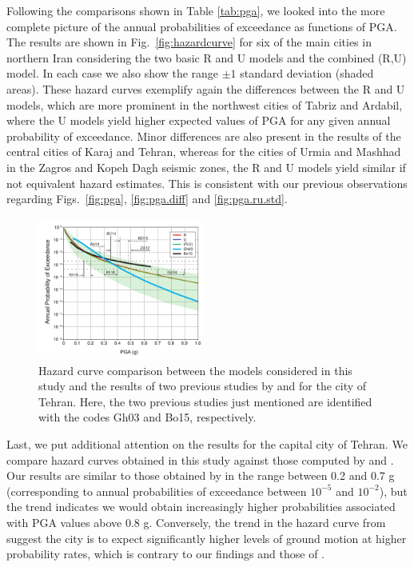 
Following the comparisons shown in Table \ref{tab:pga}, we looked into the more complete picture of the annual probabilities of exceedance as functions of PGA. The results are shown in Fig.~\ref{fig:hazardcurve} for six of the main cities in northern Iran considering the two basic R and U models and the combined (R,U) model. In each case we also show the range $\pm 1$ standard deviation (shaded areas). These hazard curves exemplify again the differences between the R and U models, which are more prominent in the northwest cities of Tabriz and Ardabil, where the U models yield higher expected values of PGA for any given annual probability of exceedance. Minor differences are also present in the results of the central cities of Karaj and Tehran, whereas for the cities of Urmia and Mashhad in the Zagros and Kopeh Dagh seismic zones, the R and U models yield similar if not equivalent hazard estimates. This is consistent with our previous observations regarding Figs.~\ref{fig:pga}, \ref{fig:pga.diff} and \ref{fig:pga.ru.std}.

\begin{figure}[t]
    \centering
    \includegraphics[width=0.48\textwidth]{figures/pdf/figure-12} 
    \caption{Hazard curve comparison between the models considered in this study and the results of two previous studies by \citet{Ghodrati2003} and \citet{Boostan2015} for the city of Tehran. Here, the two previous studies just mentioned are identified with the codes Gh03 and Bo15, respectively.}
    \label{fig:tehran}
\end{figure}

Last, we put additional attention on the results for the capital city of Tehran. We compare hazard curves obtained in this study against those computed by \citet{Ghodrati2003} and \citet{Boostan2015}. Our results are similar to those obtained by \citet{Ghodrati2003} in the range between 0.2 and 0.7 g (corresponding to annual probabilities of exceedance between $10^{-5}$ and $10^{-2}$), but the trend indicates we would obtain increasingly higher probabilities associated with PGA values above 0.8 g. Conversely, the trend in the hazard curve from \citet{Boostan2015} suggest the city is to expect significantly higher levels of ground motion at higher probability rates, which is contrary to our findings and those of \citet{Ghodrati2003}.
